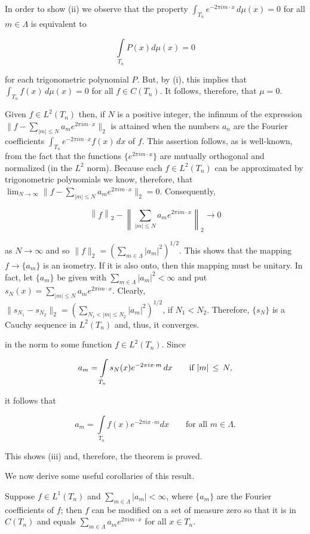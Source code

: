 In order to show (ii) we observe that the property $\int_{T_n} e^{-2\pi i m \cdot x} \, d\mu(x) = 0$ for all $m \in \Lambda$ is equivalent to

\[
\int\limits_{T_{n}}P(x)d\mu(x)=0
\]

for each trigonometric polynomial $P$. But, by (i), this implies that $\int_{T_n} f(x) \, d\mu(x) = 0$ for all $f \in C(T_n)$. It follows, therefore, that $\mu = 0$.

Given $f\in L^{2}(T_{n})$ then, if $N$ is a positive integer, the infimum of the expression $\|f-\sum_{|m|\leq N}a_{m}e^{2\pi im\cdot x}\|_{2}$ is attained when the numbers $a_{n}$ are the Fourier coefficients $\int_{T_{n}}e^{-2\pi im\cdot x}f(x)\,dx$ of $f$. This assertion follows, as is well-known, from the fact that the functions $\{e^{2\pi im\cdot x}\}$ are mutually orthogonal and normalized (in the $L^{2}$ norm). Because each $f\in L^{2}(T_{n})$ can be approximated by trigonometric polynomials we know, therefore, that $\lim_{N\to\infty}\|f-\sum_{|m|\leq N}a_{m}e^{2\pi im\cdot x}\|_{2}=0$. Consequently,

\[
\left\|f\right\|_{2}-\left\|\sum_{|m|\leq N}a_{m} e^{2\pi i m\cdot x}\right\|_{2}\rightarrow0
\]

as $N \to \infty$ and so $\|f\|_2 = (\sum_{m \in \Lambda} |a_m|^2)^{1/2}$. This shows that the mapping $f \to \{a_m\}$ is an isometry. If it is also onto, then this mapping must be unitary. In fact, let $\{a_m\}$ be given with $\sum_{m \in \Lambda} |a_m|^2 < \infty$ and put $s_N(x) = \sum_{|m| \leq N} a_m e^{2\pi i m \cdot x}$. Clearly, $\|s_{N_1} - s_{N_2}\|_2 = (\sum_{N_1 < |m| \leq N_2} |a_m|^2)^{1/2}$, if $N_1 < N_2$. Therefore, $\{s_N\}$ is a Cauchy sequence in $L^2(T_n)$ and, thus, it converges.

in the norm to some function $f \in L^{2}(T_{n})$. Since

\[
a_{m}=\intop_{\dot{T}_{n}}s_{N}(x)e^{-2\pi i x\cdot m}\,d x\qquad{\text{if }}|m|\,\leq\,N,
\]

it follows that

\[
a_{m}=\int\limits_{T_{n}}f(x)e^{-2\pi i x\cdot m}d x\qquad\text{for all }m\in\Lambda.
\]

This shows (iii) and, therefore, the theorem is proved.

We now derive some useful corollaries of this result.

\begin{corollary}
\label{cor:c7-1-8}
Suppose $f \in L^1(T_n)$ and $\sum_{m \in \Lambda} |a_m| < \infty$, where $\{a_m\}$ are the Fourier coefficients of $f$; then $f$ can be modified on a set of measure zero so that it is in $C(T_n)$ and equals $\sum_{m \in \Lambda} a_m e^{2\pi im \cdot x}$ for all $x \in T_n$.
\end{corollary}

